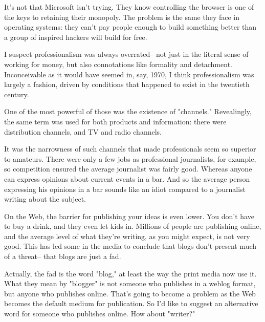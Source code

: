 It's
                  not that Microsoft isn't trying. They know controlling the
                  browser is one of the keys to retaining their monopoly. The
                  problem is the same they face in operating systems: they can't
                  pay people enough to build something better than a group of
                  inspired hackers will build for free.

I suspect
                  professionalism was always overrated-- not just in the literal
                  sense of working for money, but also connotations like
                  formality and detachment. Inconceivable as it would have
                  seemed in, say, 1970, I think professionalism was largely a
                  fashion, driven by conditions that happened to exist in the
                  twentieth century.

One of the most powerful of
                  those was the existence of "channels." Revealingly, the same
                  term was used for both products and information: there were
                  distribution channels, and TV and radio channels.

It
                  was the narrowness of such channels that made professionals
                  seem so superior to amateurs. There were only a few jobs as
                  professional journalists, for example, so competition ensured
                  the average journalist was fairly good. Whereas anyone can
                  express opinions about current events in a bar. And so the
                  average person expressing his opinions in a bar sounds like an
                  idiot compared to a journalist writing about the subject.

On
                  the Web, the barrier for publishing your ideas is even lower.
                  You don't have to buy a drink, and they even let kids in.
                  Millions of people are publishing online, and the average
                  level of what they're writing, as you might expect, is not
                  very good. This has led some in the media to conclude that
                  blogs don't present much of a threat-- that blogs are just a
                  fad.

Actually, the fad is the word "blog," at least
                  the way the print media now use it. What they mean by
                  "blogger" is not someone who publishes in a weblog format, but
                  anyone who publishes online. That's going to become a problem
                  as the Web becomes the default medium for publication. So I'd
                  like to suggest an alternative word for someone who publishes
                  online. How about "writer?"


